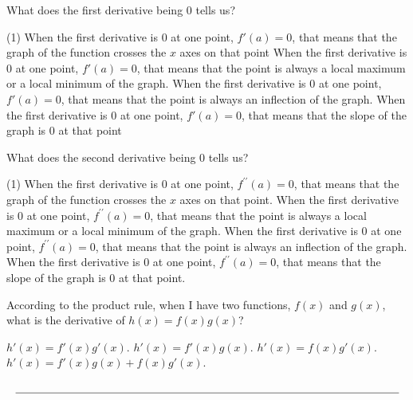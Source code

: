 \documentclass[12pt, noquestionbreak, flushbottom, customfontpath=../Fonts/]{../skrexam}  %
\begin{document}
\begin{questions}
	\question What does the first derivative being 0 tells us?
	\begin{choices}(1)
		\choice When the first derivative is $0$ at one point, $f'(a) = 0$, that means that the graph of the function crosses the $x$ axes on that point
		\choice When the first derivative is $0$ at one point, $f'(a) = 0$, that means that the point is always a local maximum or a local minimum of the graph.
		\choice When the first derivative is $0$ at one point, $f'(a) = 0$, that means that the point is always an inflection of the graph.
		\choice\CorrectChoice When the first derivative is $0$ at one point, $f'(a) = 0$, that means that the slope of the graph is $0$ at that point
	\end{choices}

	\question What does the second derivative being 0 tells us?
	\begin{choices}(1)
		\choice When the first derivative is $0$ at one point, $f^{\prime \prime}(a) = 0$, that means that the graph of the function crosses the $x$ axes on that point.
		\choice When the first derivative is $0$ at one point, $f^{\prime \prime}(a) = 0$, that means that the point is always a local maximum or a local minimum of the graph.
		\choice\CorrectChoice When the first derivative is $0$ at one point, $f^{\prime \prime}(a) = 0$, that means that the point is always an inflection of the graph.
		\choice When the first derivative is $0$ at one point, $f^{\prime \prime}(a) = 0$, that means that the slope of the graph is $0$ at that point.
	\end{choices}

	\question According to the product rule, when I have two functions, $f(x)$ and $g(x)$, what is the derivative of $h(x) = f(x) g(x)$?
	\begin{choices}
		\choice $h'(x) = f'(x) g '(x)$.
		\choice $h'(x) = f'(x) g(x)$.
		\choice $h'(x) = f(x) g '(x)$.
		\choice\CorrectChoice $h'(x) = f'(x) g(x)+ f(x) g '(x)$.
	\end{choices}


\end{questions}






\[
\underset{%
	}{%
	\text{\underline{\hspace{\textwidth}}}%
}
\]
\setcounter{totalpages}{\value{page}}
\setcounter{totalsections}{\value{section}}
\end{document}
